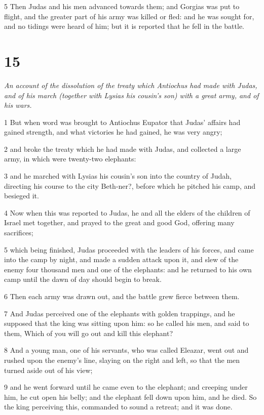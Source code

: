 5 Then Judas and his men advanced towards them; and Gorgias was put to flight, and the greater part of his army was killed or fled: and he was sought for, and no tidings were heard of him; but it is reported that he fell in the battle. 

\chapter{15}

\par \textit{An account of the dissolution of the treaty which Antiochus had made with Judas, and of his march (together with Lysias his cousin's son) with a great army, and of his wars.}

1 But when word was brought to Antiochus Eupator that Judas’ affairs had gained strength, and what victories he had gained, he was very angry; 

2 and broke the treaty which he had made with Judas, and collected a large army, in which were twenty-two elephants: 

3 and he marched with Lysias his cousin’s son into the country of Judah, directing his course to the city Beth-ner?, before which he pitched his camp, and besieged it. 

4 Now when this was reported to Judas, he and all the elders of the children of Israel met together, and prayed to the great and good God, offering many sacrifices; 

5 which being finished, Judas proceeded with the leaders of his forces, and came into the camp by night, and made a sudden attack upon it, and slew of the enemy four thousand men and one of the elephants: and he returned to his own camp until the dawn of day should begin to break. 

6 Then each army was drawn out, and the battle grew fierce between them. 

7 And Judas perceived one of the elephants with golden trappings, and he supposed that the king was sitting upon him: so he called his men, and said to them, Which of you will go out and kill this elephant? 

8 And a young man, one of his servants, who was called Eleazar, went out and rushed upon the enemy’s line, slaying on the right and left, so that the men turned aside out of his view; 

9 and he went forward until he came even to the elephant; and creeping under him, he cut open his belly; and the elephant fell down upon him, and he died. So the king perceiving this, commanded to sound a retreat; and it was done. 

